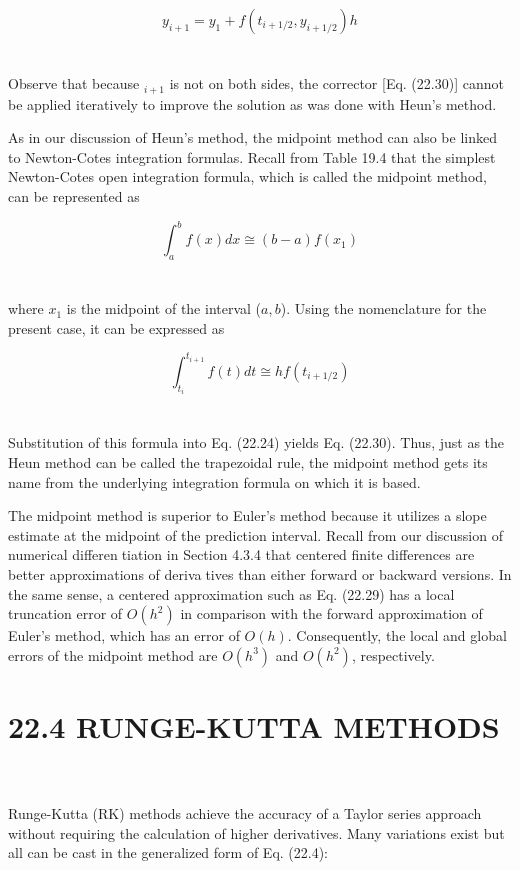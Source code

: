 \begin{equation}
\tag{22.30}
y_{i+1} = y_{1} + f( t_{i+1/2}, y_{i+1/2})h
\end{equation}\\
\\
Observe that because $_{i+1}$ is not on both sides, the corrector [Eq. (22.30)] cannot be applied
iteratively to improve the solution as was done with Heun’s method.

As in our discussion of Heun’s method, the midpoint method can also be linked to
Newton-Cotes integration formulas. Recall from Table 19.4 that the simplest Newton-Cotes
open integration formula, which is called the midpoint method, can be represented as

\begin{equation}
\tag{22.31}
\int^b_a f(x)dx \cong (b-a)f(x_{1})
\end{equation}\\
\\
where $x_{1}$ is the midpoint of the interval ($a, b$). Using the nomenclature for the present case,
it can be expressed as

\begin{equation}
\tag{22.32}
\int^{t_{i+1}}_{t_{i}} f(t)dt \cong hf(t_{i+1/2})
\end{equation}\\
\\
Substitution of this formula into Eq. (22.24) yields Eq. (22.30). Thus, just as the Heun
method can be called the trapezoidal rule, the midpoint method gets its name from the
underlying integration formula on which it is based.

The midpoint method is superior to Euler’s method because it utilizes a slope estimate
at the midpoint of the prediction interval. Recall from our discussion of numerical differentiation in Section 4.3.4 that centered finite differences are better approximations of derivatives than either forward or backward versions. In the same sense, a centered approximation
such as Eq. (22.29) has a local truncation error of $O(h^2)$ in comparison with the forward
approximation of Euler’s method, which has an error of $O(h)$. Consequently, the local and
global errors of the midpoint method are $O(h^3)$ and $O(h^2)$,  respectively.

\vspace{0,3in}
\chapter{22.4 RUNGE-KUTTA METHODS}
\vspace{0,1in}
\hline\\
\vspace{0,1in}
\\
Runge-Kutta (RK) methods achieve the accuracy of a Taylor series approach without
requiring the calculation of higher derivatives. Many variations exist but all can be cast in
the generalized form of Eq. (22.4):

